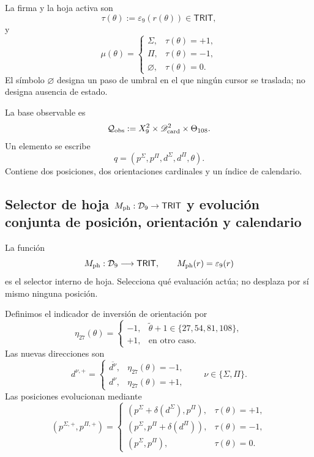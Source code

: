 {La firma y la hoja activa son
\[
 \tau(\theta):=\varepsilon_9(r(\theta))\in\mathsf{TRIT},
\]
y
\[
 \mu(\theta)=
 \begin{cases}
  \Sigma,&\tau(\theta)=+1,\\
  \Pi,&\tau(\theta)=-1,\\
  \varnothing,&\tau(\theta)=0.
 \end{cases}
\]
El símbolo \(\varnothing\) designa un paso de umbral en el que ningún cursor
se traslada; no designa ausencia de estado.

\begin{definition}
\label{p12-83-c1-s3:def:tpk-configuracion-observable}
La base observable es
\[
 \mathcal Q_{\rm obs}
 :=X_9^2\times\mathscr D_{\rm card}^2\times\Theta_{108}.
\]
Un elemento se escribe
\[
 q=(p^\Sigma,p^\Pi,d^\Sigma,d^\Pi,\theta).
\]
Contiene dos posiciones, dos orientaciones cardinales y un índice de
calendario.
\end{definition}

\subsection{Selector de hoja \(M_{\rm ph}:\mathcal D_9\to\mathsf{TRIT}\) y evolución conjunta de posición, orientación y calendario}

La función
\[
 M_{\rm ph}:\mathcal D_9\longrightarrow\mathsf{TRIT},
 \qquad M_{\rm ph}(r)=\varepsilon_9(r)
\]
es el selector interno de hoja. Selecciona qué evaluación actúa; no desplaza
por sí mismo ninguna posición.

Definimos el indicador de inversión de orientación por
\[
 \eta_{27}(\theta)=
 \begin{cases}
  -1,&\widetilde\theta+1\in\{27,54,81,108\},\\
  +1,&\text{en otro caso}.
 \end{cases}
\]
Las nuevas direcciones son
\[
 d^{\nu,+}=
 \begin{cases}
  \overline{d^\nu},&\eta_{27}(\theta)=-1,\\
  d^\nu,&\eta_{27}(\theta)=+1,
 \end{cases}
 \qquad \nu\in\{\Sigma,\Pi\}.
\]
Las posiciones evolucionan mediante
\[
 (p^{\Sigma,+},p^{\Pi,+})=
 \begin{cases}
 (p^\Sigma+\delta(d^\Sigma),p^\Pi),&\tau(\theta)=+1,\\
 (p^\Sigma,p^\Pi+\delta(d^\Pi)),&\tau(\theta)=-1,\\
 (p^\Sigma,p^\Pi),&\tau(\theta)=0.
 \end{cases}
\]

}
